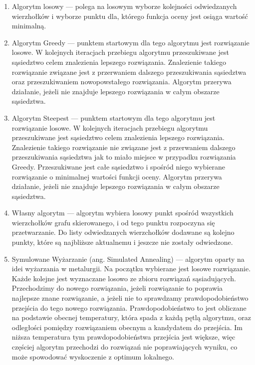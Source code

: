 \begin{enumerate}

\item Algorytm losowy --- polega na losowym wyborze kolejności
odwiedzanych wierzhołków i wyborze punktu dla, którego funkcja
oceny jest osiąga wartość minimalną.

\item Algorytm Greedy --- punktem startowym dla tego algorytmu jest
rozwiązanie losowe. W kolejnych iteracjach przebiegu algorytmu przeszukiwane
jest sąsiedztwo celem znalezienia lepszego rozwiązania. Znalezienie takiego
rozwiązanie związane jest z przerwaniem dalszego przeszukiwania sąsiedztwa
oraz przeszukiwaniem nowopowstałego rozwiązania.
Algorytm przerywa działanie, jeżeli nie znajduje lepszego rozwiązania w
całym obszarze sąsiedztwa.

\item Algorytm Steepest --- punktem startowym dla tego algorytmu jest
rozwiązanie losowe. W kolejnych iteracjach przebiegu algorytmu przeszukiwane
jest sąsiedztwo celem znalezienia lepszego rozwiązania. Znalezienie takiego
rozwiązanie nie związane jest z przerwaniem dalszego przeszukiwania sąsiedztwa
jak to miało miejsce w przypadku rozwiązania Greedy. Przeszukiwane jest
całe sąsiedztwo i spośród niego wybierane rozwiązanie o minimalnej wartości
funkcji oceny.
Algorytm przerywa działanie, jeżeli nie znajduje lepszego rozwiązania w
całym obszarze sąsiedztwa.

\item Własny algorytm --- algorytm wybiera losowy punkt spośród wszystkich
wierzchołków grafu skierowanego, i od tego punktu rozpoczyna się
przetwarzanie. Do listy odwiedzanych wierzchołków dodawane są kolejno
punkty, które są najbliższe aktualnemu i jeszcze nie zostały odwiedzone.

\item Symulowane Wyżarzanie (ang. Simulated Annealing) --- algorytm oparty 
na idei wyżarzania w metalurgii.
Na początku wybierane jest losowe rozwiązanie. Każde kolejne jest wyznaczane 
losowo ze zbioru rozwiązań sąsiadujących. Przechodzimy do nowego rozwiązania,
jeżeli rozwiązanie to poprawia najlepsze znane rozwiązanie, a jeżeli nie to 
sprawdzamy prawdopodobieństwo przejścia do tego nowego rozwiązania. 
Prawdopodobieństwo to jest obliczane
na podstawie obecnej temperatury, która spada z każdą pętlą algorytmu, oraz
odległości pomiędzy rozwiązaniem obecnym a kandydatem do przejścia. Im niższa
temperatura tym prawdopodobieństwa przejścia jest większe, więc częściej 
algorytm przechodzi do rozwiązań nie poprawiających wyniku, co może spowodować
wyskoczenie z optimum lokalnego.


\end{enumerate}
